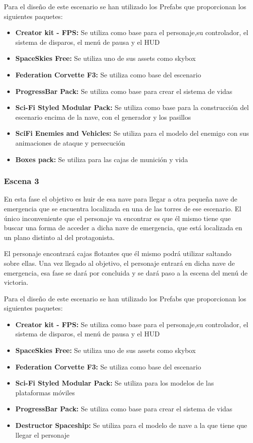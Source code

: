 Para el diseño de este escenario se han utilizado los Prefabs que proporcionan los siguientes paquetes:
\begin{itemize}
	\item \textbf{Creator kit - FPS:} Se utiliza como base para el personaje,su controlador, el sistema de disparos, el menú de pausa y el HUD
	\item \textbf{SpaceSkies Free:} Se utiliza uno de sus assets como skybox
	\item \textbf{Federation Corvette F3:} Se utiliza como base del escenario
	\item \textbf{ProgressBar Pack:} Se utiliza como base para crear el sistema de vidas
	\item \textbf{Sci-Fi Styled Modular Pack:} Se utiliza como base para la construcción del escenario encima de la nave, con el generador y los pasillos
	\item \textbf{SciFi Enemies and Vehicles:} Se utiliza para el modelo del enemigo con sus animaciones de ataque y persecución
	\item \textbf{Boxes pack:} Se utiliza para las cajas de munición y vida
\end{itemize}


\subsubsection{Escena 3}
En esta fase el objetivo es huir de esa nave para llegar a otra pequeña nave de emergencia que se encuentra localizada en una de las torres de ese escenario. El único inconveniente que el personaje va encontrar es que él mismo tiene que buscar una forma de acceder a dicha nave de emergencia, que está localizada en un plano distinto al del protagonista.

El personaje encontrará cajas flotantes que él mismo podrá utilizar saltando sobre ellas. Una vez llegado al objetivo, el personaje entrará en dicha nave de emergencia, esa fase se dará por concluida y se dará paso a la escena del menú de victoria.

Para el diseño de este escenario se han utilizado los Prefabs que proporcionan los siguientes paquetes:
\begin{itemize}
	\item \textbf{Creator kit - FPS:} Se utiliza como base para el personaje,su controlador, el sistema de disparos, el menú de pausa y el HUD
	\item \textbf{SpaceSkies Free:} Se utiliza uno de sus assets como skybox
	\item \textbf{Federation Corvette F3:} Se utiliza como base del escenario
	\item \textbf{Sci-Fi Styled Modular Pack:} Se utiliza para los modelos de las plataformas móviles
	\item \textbf{ProgressBar Pack:} Se utiliza como base para crear el sistema de vidas
	\item \textbf{Destructor Spaceship:} Se utiliza para el modelo de nave a la que tiene que llegar el personaje
\end{itemize}

